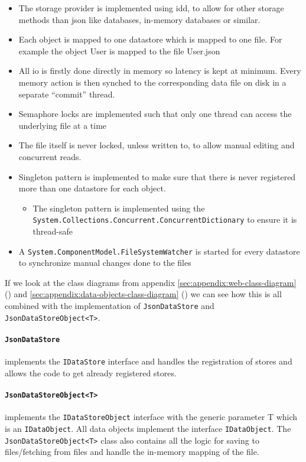 \documentclass{article}
\begin{document}
\begin{itemize}
    \item The storage provider is implemented using \gls{idd}, to allow for other storage methods than \gls{json} like databases, in-memory databases or similar.
    \item Each object is mapped to one datastore which is mapped to one file. For example the object User is mapped to the file User.json
    \item All \gls{io} is firstly done directly in memory so latency is kept at minimum. Every memory action is then synched to the corresponding data file on disk in a separate \enquote{commit} thread.
    \item Semaphore locks are implemented such that only one thread can access the underlying file at a time
    \item The file itself is never locked, unless written to, to allow manual editing and concurrent reads.
    \item Singleton pattern is implemented to make sure that there is never registered more than one datastore for each object.
    \begin{itemize}
        \item The singleton pattern is implemented using the \texttt{System.Collections.Concurrent.ConcurrentDictionary} to ensure it is thread-safe
    \end{itemize}
    \item A \texttt{System.ComponentModel.FileSystemWatcher} is started for every datastore to synchronize manual changes done to the files
\end{itemize}

If we look at the class diagrams from appendix \ref{sec:appendix:web-class-diagram} () and \ref{sec:appendix:data-objects-class-diagram} () we can see how this is all combined with the implementation of \texttt{JsonDataStore} and \texttt{JsonDataStoreObject<T>}. 

\paragraph{\texttt{JsonDataStore}} implements the \texttt{IDataStore} interface and handles the registration of stores and allows the code to get already registered stores.
\paragraph{\texttt{JsonDataStoreObject<T>}} implements the \texttt{IDataStoreObject} interface with the generic parameter T which is an \texttt{IDataObject}. All data objects implement the interface \texttt{IDataObject}. The \texttt{JsonDataStoreObject<T>}  class also contains all the logic for saving to files/fetching from files and handle the in-memory mapping of the file.
\end{document}
